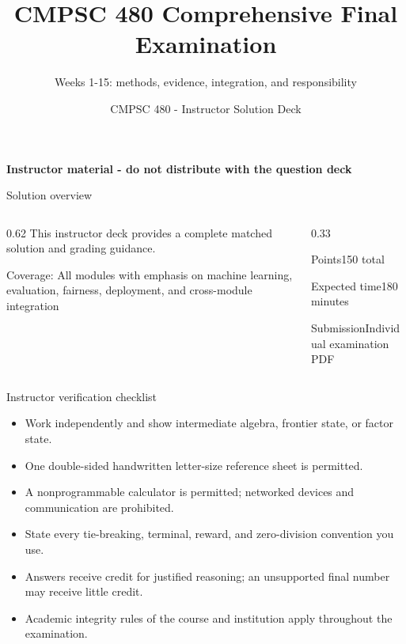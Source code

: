 \documentclass[aspectratio=169,11pt]{beamer}
\title[Final Examination Solutions]{CMPSC 480 Comprehensive Final Examination}
\subtitle{Weeks 1-15: methods, evidence, integration, and responsibility}
\author{CMPSC 480 - Instructor Solution Deck}
\date{}
\begin{document}
\begin{frame}
  \titlepage
\vspace{-0.35cm}
\begin{center}
\color{coursered}\bfseries Instructor material - do not distribute with the question deck
\end{center}
\end{frame}

\begin{frame}{Solution overview}
\begin{columns}[T,onlytextwidth]
\begin{column}{0.62\textwidth}
\Large This instructor deck provides a complete matched solution and grading guidance.

\vspace{0.35cm}
\normalsize
Coverage: All modules with emphasis on machine learning, evaluation, fairness, deployment, and cross-module integration
\end{column}
\begin{column}{0.33\textwidth}
\begin{block}{Points}150 total\end{block}
\begin{block}{Expected time}180 minutes\end{block}
\begin{block}{Submission}Individual examination PDF\end{block}
\end{column}
\end{columns}
\end{frame}

\begin{frame}{Instructor verification checklist}
\small
\begin{itemize}
  \item Work independently and show intermediate algebra, frontier state, or factor state.
  \item One double-sided handwritten letter-size reference sheet is permitted.
  \item A nonprogrammable calculator is permitted; networked devices and communication are prohibited.
  \item State every tie-breaking, terminal, reward, and zero-division convention you use.
  \item Answers receive credit for justified reasoning; an unsupported final number may receive little credit.
  \item Academic integrity rules of the course and institution apply throughout the examination.
\end{itemize}
\end{frame}
\end{document}
